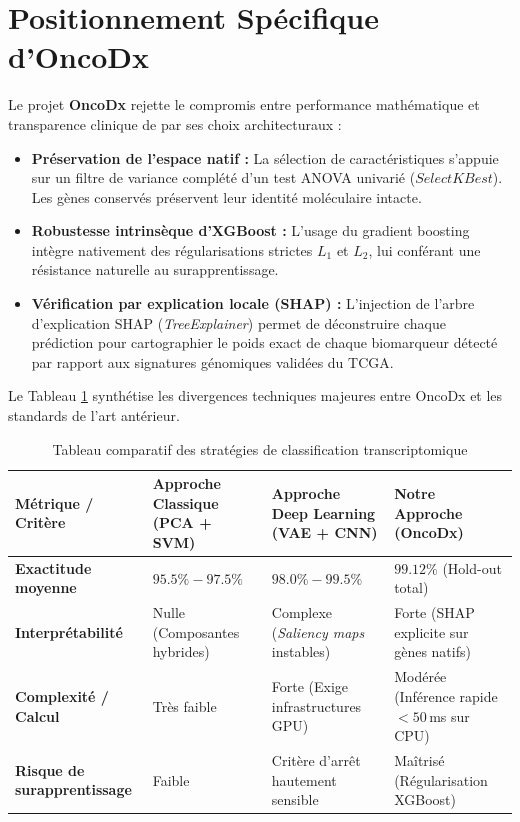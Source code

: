 \documentclass[12pt,a4paper]{report}
\begin{document}
\section{Positionnement Sp\'ecifique d'OncoDx}
Le projet \textbf{OncoDx} rejette le compromis entre performance math\'ematique et transparence clinique de par ses choix architecturaux :
\begin{itemize}[label=\textbullet]
    \item \textbf{Pr\'eservation de l'espace natif :} La s\'election de caract\'eristiques s'appuie sur un filtre de variance compl\'et\'e d'un test ANOVA univari\'e ($SelectKBest$). Les g\`enes conserv\'es pr\'eservent leur identit\'e mol\'eculaire intacte.
    \item \textbf{Robustesse intrins\`eque d'XGBoost :} L'usage du gradient boosting int\`egre nativement des r\'egularisations strictes $L_1$ et $L_2$, lui conf\'erant une r\'esistance naturelle au surapprentissage.
    \item \textbf{V\'erification par explication locale (SHAP) :} L'injection de l'arbre d'explication SHAP (\textit{TreeExplainer}) permet de d\'econstruire chaque pr\'ediction pour cartographier le poids exact de chaque biomarqueur d\'etect\'e par rapport aux signatures g\'enomiques valid\'ees du TCGA.
\end{itemize}

Le Tableau \ref{tab:comparison_art} synth\'etise les divergences techniques majeures entre OncoDx et les standards de l'art ant\'erieur.

\begin{table}[H]
\centering
\small
\caption{Tableau comparatif des strat\'egies de classification transcriptomique}
\label{tab:comparison_art}
\begin{tabularx}{\textwidth}{lXXX}
\toprule
\textbf{M\'etrique / Crit\`ere} & \textbf{Approche Classique (PCA + SVM)} & \textbf{Approche Deep Learning (VAE + CNN)} & \textbf{Notre Approche (OncoDx)} \\
\midrule
\textbf{Exactitude moyenne} & $95.5\% - 97.5\%$ & $98.0\% - 99.5\%$ & $\mathbf{99.12\%}$ (Hold-out total) \\
\textbf{Interpr\'etabilit\'e} & Nulle (Composantes hybrides) & Complexe (\textit{Saliency maps} instables) & Forte (SHAP explicite sur g\`enes natifs) \\
\textbf{Complexit\'e / Calcul} & Tr\`es faible & Forte (Exige infrastructures GPU) & Mod\'er\'ee (Inf\'erence rapide $<50$\,ms sur CPU) \\
\textbf{Risque de surapprentissage} & Faible & Crit\`ere d'arr\^et hautement sensible & Ma\^itris\'e (R\'egularisation XGBoost) \\
\bottomrule
\end{tabularx}
\end{table}
\end{document}
